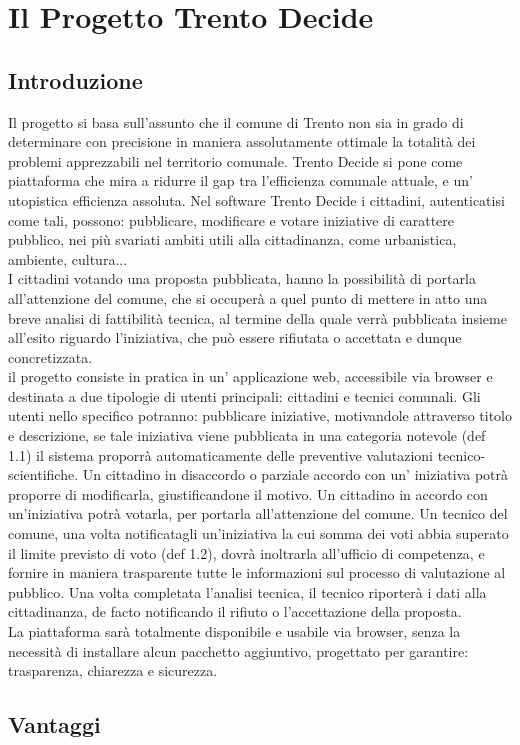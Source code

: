 \chapter{Il Progetto Trento Decide}

\section{Introduzione}
Il progetto si basa sull'assunto che il comune di Trento non sia in grado di determinare con precisione in maniera assolutamente ottimale la totalità dei problemi apprezzabili nel territorio comunale. Trento Decide si pone come piattaforma che mira a ridurre il gap tra l'efficienza comunale attuale, e un' utopistica efficienza assoluta. Nel software Trento Decide i cittadini, autenticatisi come tali, possono: pubblicare, modificare e votare iniziative di carattere pubblico, nei più svariati ambiti utili alla cittadinanza, come urbanistica, ambiente, cultura... \\
I cittadini votando una proposta pubblicata, hanno la possibilità di portarla all'attenzione del comune, che si occuperà a quel punto di mettere in atto una breve analisi di fattibilità tecnica, al termine della quale verrà pubblicata insieme all'esito riguardo l'iniziativa, che può essere rifiutata o accettata e dunque concretizzata. \\
il progetto consiste in pratica in un' applicazione web, accessibile via browser e destinata a due tipologie di utenti principali: cittadini e tecnici comunali.
Gli utenti nello specifico potranno: pubblicare iniziative, motivandole attraverso titolo e descrizione, se tale iniziativa viene pubblicata in una categoria notevole (def 1.1) il sistema proporrà automaticamente delle preventive valutazioni tecnico-scientifiche. Un cittadino in disaccordo o parziale accordo con un' iniziativa potrà proporre di modificarla, giustificandone il motivo. Un cittadino in accordo con un'iniziativa potrà votarla, per portarla all'attenzione del comune. Un tecnico del comune, una volta notificatagli un'iniziativa la cui somma dei voti abbia superato il limite previsto di voto (def 1.2), dovrà inoltrarla all'ufficio di competenza, e fornire in maniera trasparente tutte le informazioni sul processo di valutazione al pubblico. Una volta completata l'analisi tecnica, il tecnico riporterà i dati alla cittadinanza, de facto notificando il rifiuto o l'accettazione della proposta. \\
La piattaforma sarà totalmente disponibile e usabile via browser, senza la necessità di installare alcun pacchetto aggiuntivo, progettato per garantire: trasparenza, chiarezza e sicurezza.

\section{Vantaggi}
